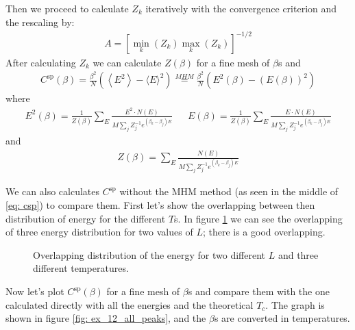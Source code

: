 \documentclass[../main.tex]{subfiles}
\begin{document}
Then we proceed to calculate $Z_k$ iteratively with the convergence criterion and the rescaling by:
\begin{align}
A=\left[\min _{k}\left(Z_{k}\right) \max _{k}\left(Z_{k}\right)\right]^{-1 / 2}    
\end{align}
After calculating $Z_k$ we can calculate $Z(\beta)$ for a fine mesh of $\beta$s and 
\begin{align}
    C^{\text{sp}}(\beta) =  \frac{\beta^2}{N}\left(\left\langle E^{2}\right\rangle-\langle E\rangle^{2}\right) \stackrel{MHM}{=} \frac{\beta^2}{N}\left(E^2(\beta) -  (E(\beta))^2\right)
    \label{eq: csp}
\end{align} where
\begin{align}
    E^2(\beta)= \frac{1}{Z(\beta)} \sum_{E} \frac{ E^2 \cdot N(E)}{M\sum_{j} Z_{j}^{-1} e^{\left(\beta_{k}-\beta_{j}\right) E}} &&
    E(\beta)=\frac{1}{Z(\beta)}\sum_{E} \frac{ E \cdot N(E)}{M\sum_{j} Z_{j}^{-1} e^{\left(\beta_{k}-\beta_{j}\right) E}}
\end{align} and
\begin{align}
    Z(\beta)= \sum_{E}  \frac{N(E)}{M\sum_{j} Z_{j}^{-1} e^{\left(\beta_{k}-\beta_{j}\right) E}}
\end{align}

We can also calculates $C^{\text{sp}}$ without the MHM method (as seen in the middle of \eqref{eq: csp}) to compare them. First let's show the overlapping between then distribution of energy for the different $T$s. In figure \ref{fig: ex_12_overlap} we can see the overlapping of three energy distribution for two values of $L$; there is a good overlapping.

\begin{figure}[!ht]
    \centering
    \begin{subfigure}{.49\textwidth}
        \centering
        
    \end{subfigure}
    \begin{subfigure}{.49\textwidth}
        \centering
        
    \end{subfigure}
    \caption{Overlapping distribution of the energy for two different $L$ and three different temperatures.}
    \label{fig: ex_12_overlap}
\end{figure}

Now let's plot $C^{\text{sp}}(\beta)$ for a fine mesh of $\beta$s and compare them with the one calculated directly with all the energies and the theoretical $T_c$. The graph is shown in figure \ref{fig: ex_12_all_peaks}, and the $\beta$s are converted in temperatures.
\end{document}
